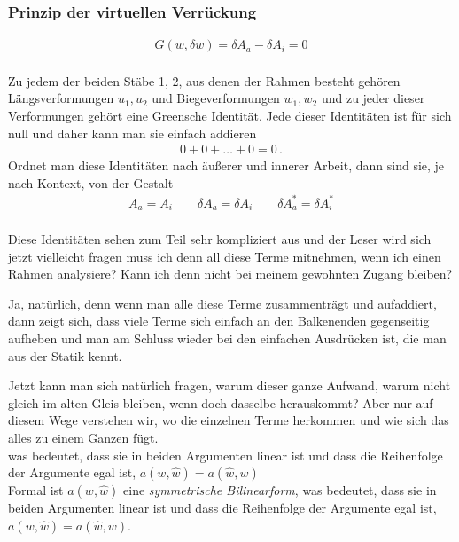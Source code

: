 \subsubsection*{Prinzip der virtuellen Verr\"{u}ckung}
\vspace{-0.7cm}
\begin{align}
G(w, \delta w) = \delta A_a - \delta A_i = 0
\end{align}
\\

Zu jedem der beiden St\"{a}be 1, 2, aus denen der Rahmen besteht geh\"{o}ren L\"{a}ngsverformungen $u_1, u_2$ und Biegeverformungen $w_1, w_2$ und zu jeder dieser Verformungen geh\"{o}rt eine Greensche Identit\"{a}t. Jede dieser  Identit\"{a}ten ist f\"{u}r sich null und daher kann man sie einfach addieren
\begin{align}
0 + 0 + \ldots + 0 = 0\,.
\end{align}
Ordnet man diese Identit\"{a}ten nach \"{a}u{\ss}erer und innerer Arbeit, dann sind sie, je nach Kontext, von der Gestalt
\begin{align} \label{Eq13}
A_a = A_i \qquad \delta A_a = \delta A_i \qquad \delta A_a^* = \delta A_i^*
\end{align}\\



Diese Identit\"{a}ten sehen zum Teil sehr kompliziert aus und der Leser wird sich jetzt vielleicht fragen muss ich denn all diese Terme mitnehmen, wenn ich einen Rahmen analysiere? Kann ich denn nicht bei meinem gewohnten Zugang bleiben?

Ja, nat\"{u}rlich, denn wenn man alle diese Terme zusammentr\"{a}gt und aufaddiert, dann zeigt sich, dass  viele Terme sich einfach an den Balkenenden gegenseitig aufheben und man am Schluss wieder bei den einfachen Ausdr\"{u}cken ist, die man aus der Statik kennt.

Jetzt kann man sich nat\"{u}rlich fragen, warum dieser ganze Aufwand, warum nicht gleich im alten Gleis bleiben, wenn doch dasselbe herauskommt? Aber nur auf diesem Wege verstehen wir, wo die einzelnen Terme herkommen und wie sich das alles zu einem Ganzen f\"{u}gt.\\


was bedeutet, dass sie in beiden Argumenten linear ist
und dass  die Reihenfolge der Argumente egal ist, $a(w,\hat{w}) = a(\hat{w},w)$\\

Formal ist $a(w,\hat{w})$ eine {\em symmetrische Bilinearform\/}, was bedeutet, dass sie in beiden Argumenten linear ist
und dass  die Reihenfolge der Argumente egal ist, $a(w,\hat{w}) = a(\hat{w},w)$.

